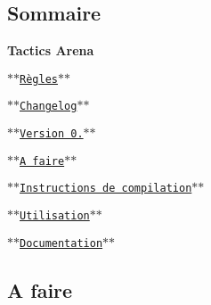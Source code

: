 \subsection*{Sommaire}

{\bfseries Tactics Arena}


\begin{DoxyEnumerate}
\item $\ast$$\ast$\href{#markdown-header-regles}{\tt Règles}$\ast$$\ast$
\item $\ast$$\ast$\href{#markdown-header-changelog}{\tt Changelog}$\ast$$\ast$
\begin{DoxyItemize}
\item $\ast$$\ast$\href{#markdown-header-version-01}{\tt Version 0.}$\ast$$\ast$
\end{DoxyItemize}
\item $\ast$$\ast$\href{#markdown-header-a-faire}{\tt A faire}$\ast$$\ast$
\item $\ast$$\ast$\href{#markdown-header-instructions-de-compilation}{\tt Instructions de compilation}$\ast$$\ast$
\item $\ast$$\ast$\href{#markdown-header-utilisation}{\tt Utilisation}$\ast$$\ast$
\item $\ast$$\ast$\href{#markdown-header-documentation}{\tt Documentation}$\ast$$\ast$
\end{DoxyEnumerate}

\subsection*{A faire}


